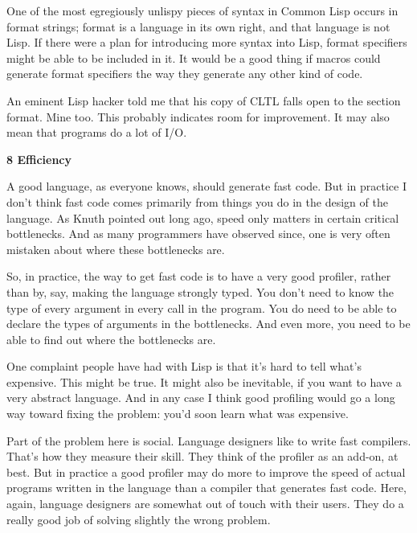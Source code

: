 One
                  of the most egregiously unlispy pieces of syntax in Common
                  Lisp occurs in format strings; format is a language in its own
                  right, and that language is not Lisp. If there were a plan for
                  introducing more syntax into Lisp, format specifiers might be
                  able to be included in it. It would be a good thing if macros
                  could generate format specifiers the way they generate any
                  other kind of code.

An eminent Lisp hacker told me
                  that his copy of CLTL falls open to the section format. Mine
                  too. This probably indicates room for improvement. It may also
                  mean that programs do a lot of I/O.

\textbf{8 Efficiency}

A good language, as everyone knows, should
                  generate fast code. But in practice I don't think fast code
                  comes primarily from things you do in the design of the
                  language. As Knuth pointed out long ago, speed only matters in
                  certain critical bottlenecks. And as many programmers have
                  observed since, one is very often mistaken about where these
                  bottlenecks are.

So, in practice, the way to get
                  fast code is to have a very good profiler, rather than by,
                  say, making the language strongly typed. You don't need to
                  know the type of every argument in every call in the program.
                  You do need to be able to declare the types of arguments in
                  the bottlenecks. And even more, you need to be able to find
                  out where the bottlenecks are.

One complaint people
                  have had with Lisp is that it's hard to tell what's expensive.
                  This might be true. It might also be inevitable, if you want
                  to have a very abstract language. And in any case I think good
                  profiling would go a long way toward fixing the problem: you'd
                  soon learn what was expensive.

Part of the problem
                  here is social. Language designers like to write fast
                  compilers. That's how they measure their skill. They think of
                  the profiler as an add-on, at best. But in practice a good
                  profiler may do more to improve the speed of actual programs
                  written in the language than a compiler that generates fast
                  code. Here, again, language designers are somewhat out of
                  touch with their users. They do a really good job of solving
                  slightly the wrong problem.

